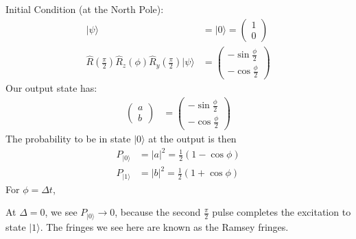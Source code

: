 \documentclass[a4paper, 11pt, normalem]{report}
\begin{document}
Initial Condition (at the North Pole):
\begin{align}
    |\psi\rangle &= |0\rangle = \begin{pmatrix} 1 \\ 0 \end{pmatrix} \\
    \hat{R}\left(\frac{\pi}{2}\right)\hat{R}_z(\phi)\hat{R}_y\left(\frac{\pi}{2}\right)|\psi\rangle &= \begin{pmatrix} -\sin\frac{\phi}{2} \\ -\cos\frac{\phi}{2}\end{pmatrix}
\end{align}
Our output state has:
\begin{align}
    \begin{pmatrix} a \\ b \end{pmatrix} &= \begin{pmatrix} -\sin\frac{\phi}{2} \\ -\cos\frac{\phi}{2}\end{pmatrix}
\end{align}
The probability to be in state $|0\rangle$ at the output is then
\begin{align}
    P_{|0\rangle} &= |a|^2 = \frac12(1-\cos\phi) \\
    P_{|1\rangle} &= |b|^2 = \frac12(1+\cos\phi)
\end{align}
For $\phi=\Delta t$,
\begin{figure}[H]
    \centering
\end{figure}

At $\Delta=0$, we see $P_{|0\rangle}\to0$, because the second $\frac{\pi}{2}$ pulse completes the excitation to state $|1\rangle$.
The fringes we see here are known as the Ramsey fringes.
\end{document}
